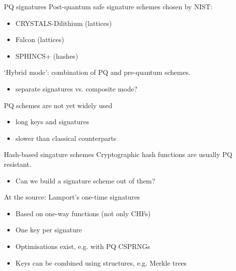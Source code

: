 \begin{frame}{PQ signatures}
  Post-quantum safe signature schemes chosen by NIST:
  \begin{itemize}[<+(1)->]
    \item CRYSTALS-Dilithium (lattices)
    \item Falcon (lattices)
    \item SPHINCS+ (hashes)
  \end{itemize}

  \vspace*{0.5em}

  \pause
  `Hybrid mode': combination of PQ and pre-quantum schemes.
  \begin{itemize}[<+(1)->]
    \item separate signatures vs. composite mode?
  \end{itemize}

  \vspace*{0.5em}

  \pause
  PQ schemes are not yet widely used
  \begin{itemize}
    \item long keys and signatures
    \item slower than classical counterparts
  \end{itemize}
\end{frame}

\begin{frame}{Hash-based singature schemes}
  \pause
  Cryptographic hash functions are usually PQ resistant.
  \begin{itemize}
    \item Can we build a signature scheme out of them?
  \end{itemize}

  \vspace*{1em}

  \pause
  At the source: Lamport's one-time signatures
  \begin{itemize}[<+(1)->]
    \item Based on one-way functions (not only CHFs)
    \item One key per signature
    \item Optimisations exist, e.g. with PQ CSPRNGs
    \item Keys can be combined using structures, e.g. Merkle trees
  \end{itemize}
\end{frame}

